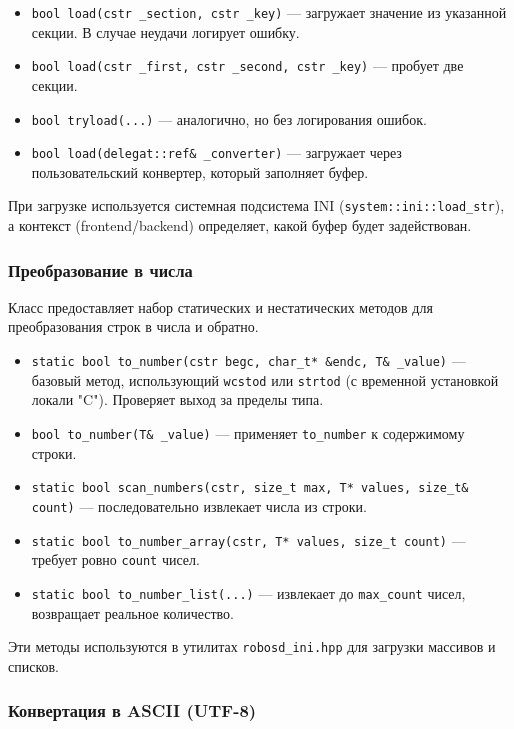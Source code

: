 \documentclass[a4paper,12pt]{article}
\begin{document}
\begin{itemize}
    \item \texttt{bool load(cstr \_section, cstr \_key)} — загружает значение из указанной секции. В случае неудачи логирует ошибку.
    \item \texttt{bool load(cstr \_first, cstr \_second, cstr \_key)} — пробует две секции.
    \item \texttt{bool tryload(...)} — аналогично, но без логирования ошибок.
    \item \texttt{bool load(delegat::ref\& \_converter)} — загружает через пользовательский конвертер, который заполняет буфер.
\end{itemize}

При загрузке используется системная подсистема INI (\texttt{system::ini::load\_str}), а контекст (frontend/backend) определяет, какой буфер будет задействован.

\subsubsection{Преобразование в числа}

Класс предоставляет набор статических и нестатических методов для преобразования строк в числа и обратно.

\begin{itemize}
    \item \texttt{static bool to\_number(cstr begc, char\_t* \&endc, T\& \_value)} — базовый метод, использующий \texttt{wcstod} или \texttt{strtod} (с временной установкой локали "C"). Проверяет выход за пределы типа.
    \item \texttt{bool to\_number(T\& \_value)} — применяет \texttt{to\_number} к содержимому строки.
    \item \texttt{static bool scan\_numbers(cstr, size\_t max, T* values, size\_t\& count)} — последовательно извлекает числа из строки.
    \item \texttt{static bool to\_number\_array(cstr, T* values, size\_t count)} — требует ровно \texttt{count} чисел.
    \item \texttt{static bool to\_number\_list(...)} — извлекает до \texttt{max\_count} чисел, возвращает реальное количество.
\end{itemize}

Эти методы используются в утилитах \texttt{robosd\_ini.hpp} для загрузки массивов и списков.

\subsubsection{Конвертация в ASCII (UTF-8)}
\end{document}

